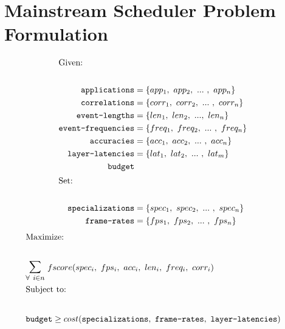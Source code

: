 \documentclass{article}
\newcommand{\var}{\texttt}
\begin{document}
\section*{Mainstream Scheduler Problem Formulation}

\begin{align*} 
\intertext{Given:} \\
\var{applications} &= \{app_1,~app_2,~...~,~app_n\} \\
\var{correlations} &= \{corr_1,~corr_2,~...~,~corr_n\} \\
\var{event-lengths} &= \{len_1,~len_2,~... ,~len_n\} \\
\var{event-frequencies} &= \{freq_1,~freq_2,~...~,~freq_n\} \\
\var{accuracies} &= \{acc_1,~acc_2,~...~,~acc_n\} \\
\var{layer-latencies} &= \{lat_1,~lat_2,~...~,~lat_m\} \\
\var{budget} \\
\intertext{Set:} \\
\var{specializations} &= \{spec_1,~spec_2,~...~,~spec_n\} \\
\var{frame-rates} &= \{fps_1,~fps_2,~...~,~fps_n\} \\
\end{align*}
\vspace{-16pt}
\begin{align*}
\intertext{Maximize:} \\
&\mathlarger{\mathlarger{\sum}}_{\forall~i \in n }~fscore(spec_i,~fps_i,~acc_i,~len_i,~freq_i,~corr_i) \\
\intertext{Subject to:} \\
&\var{budget} \geq cost(\var{specializations},~\var{frame-rates},~\var{layer-latencies}) \\
\end{align*}
\end{document}
